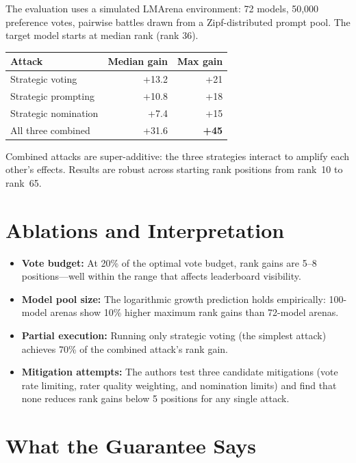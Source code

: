 \documentclass[10pt,twocolumn]{article}
\begin{document}
The evaluation uses a simulated LMArena environment: 72 models, 50,000 preference votes, pairwise battles drawn from a Zipf-distributed prompt pool.
The target model starts at median rank (rank 36).

\begin{center}
\small
\begin{tabular}{lrr}
\toprule
\textbf{Attack} & \textbf{Median gain} & \textbf{Max gain} \\
\midrule
Strategic voting & +13.2 & +21 \\
Strategic prompting & +10.8 & +18 \\
Strategic nomination & +7.4 & +15 \\
All three combined & +31.6 & \textbf{+45} \\
\bottomrule
\end{tabular}
\end{center}

Combined attacks are super-additive: the three strategies interact to amplify each other's effects.
Results are robust across starting rank positions from rank~10 to rank~65.

\section{Ablations and Interpretation}

\begin{itemize}[leftmargin=1em,itemsep=2pt]
  \item \textbf{Vote budget:} At 20\% of the optimal vote budget, rank gains are 5--8 positions---well within the range that affects leaderboard visibility.
  \item \textbf{Model pool size:} The logarithmic growth prediction holds empirically: 100-model arenas show 10\% higher maximum rank gains than 72-model arenas.
  \item \textbf{Partial execution:} Running only strategic voting (the simplest attack) achieves 70\% of the combined attack's rank gain.
  \item \textbf{Mitigation attempts:} The authors test three candidate mitigations (vote rate limiting, rater quality weighting, and nomination limits) and find that none reduces rank gains below 5 positions for any single attack.
\end{itemize}

\section{What the Guarantee Says}
\end{document}
